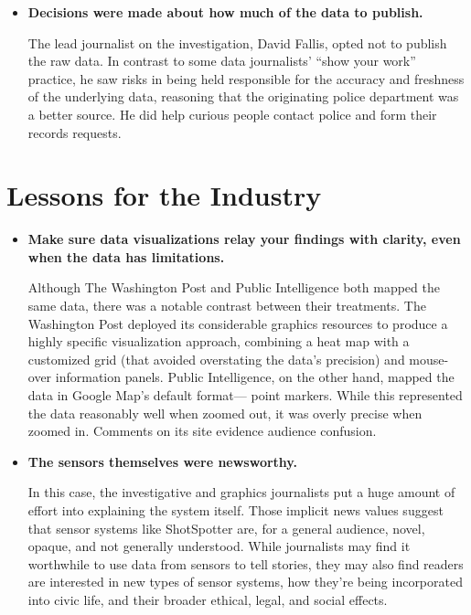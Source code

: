 \begin{itemize}
\item \textbf{Decisions were made about how much of the data to publish.}

The lead journalist on the investigation, David Fallis, opted not to
publish the raw data. In contrast to some data journalists' ``show your
work'' practice, he saw risks in being held responsible for the accuracy
and freshness of the underlying data, reasoning that the originating
police department was a better source. He did help curious people
contact police and form their records requests.
\end{itemize}

\section{Lessons for the Industry}
\begin{itemize}
\item \textbf{Make sure data visualizations relay your findings with clarity,
even when the data has limitations.}

Although The Washington Post and Public Intelligence both mapped
the same data, there was a notable contrast between their treatments.
The Washington Post deployed its considerable graphics resources to
produce a highly specific visualization approach, combining a heat
map with a customized grid (that avoided overstating the data's precision)
and mouse-over information panels. Public Intelligence, on
the other hand, mapped the data in Google Map's default format—
point markers. While this represented the data reasonably well when
zoomed out, it was overly precise when zoomed in. Comments on its
site evidence audience confusion.

\item \textbf{The sensors themselves were newsworthy.}

In this case, the investigative and graphics journalists put a huge
amount of effort into explaining the system itself. Those implicit news
values suggest that sensor systems like ShotSpotter are, for a general
audience, novel, opaque, and not generally understood. While journalists
may find it worthwhile to use data from sensors to tell stories,
they may also find readers are interested in new types of sensor systems,
how they're being incorporated into civic life, and their broader
ethical, legal, and social effects.
\end{itemize}

